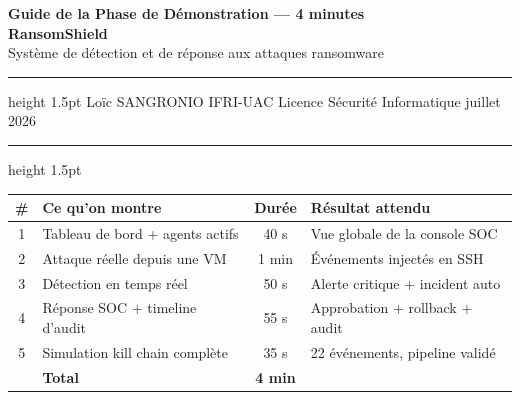 \documentclass[a4paper,11pt]{article}
\begin{document}

\begin{center}
  {\LARGE\bfseries\color{ifriblue} Guide de la Phase de Démonstration — 4 minutes}\\[6pt]
  {\Large\bfseries RansomShield}\\[4pt]
  {\large Système de détection et de réponse aux attaques ransomware}\\[8pt]
  \hrule height 1.5pt
  \vspace{4pt}
  {\small Loïc SANGRONIO \quad\textbar\quad IFRI-UAC
    \quad\textbar\quad Licence Sécurité Informatique
    \quad\textbar{} juillet 2026}
  \vspace{4pt}
  \hrule height 1.5pt
\end{center}

\vspace{6pt}

\begin{tcolorbox}[colback=lightblue,colframe=ifriblue,arc=5pt,boxrule=1pt]
  \begin{center}
  \renewcommand{\arraystretch}{1.3}
  \begin{tabular}{@{}c l c l@{}}
    \toprule
    \textbf{\#} & \textbf{Ce qu'on montre} & \textbf{Durée} & \textbf{Résultat attendu} \\
    \midrule
    1 & Tableau de bord + agents actifs   & 40 s       & Vue globale de la console SOC \\
    2 & Attaque réelle depuis une VM      & 1 min      & Événements injectés en SSH \\
    3 & Détection en temps réel           & 50 s       & Alerte critique + incident auto \\
    4 & Réponse SOC + timeline d'audit    & 55 s       & Approbation + rollback + audit \\
    5 & Simulation kill chain complète    & 35 s       & 22 événements, pipeline validé \\
    \midrule
    & \textbf{Total} & \textbf{4 min} & \\
    \bottomrule
  \end{tabular}
  \end{center}
\end{tcolorbox}

\end{document}
